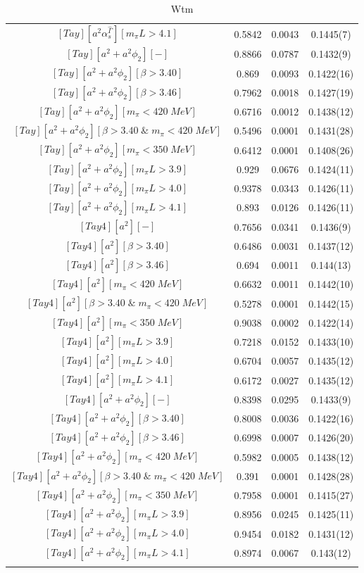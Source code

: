 \begin{longtable}{ c | c | c | c }
$[Tay][a^2\alpha_s^{\hat{\Gamma}}][m_{\pi}L>4.1]$ & 0.5842 & 0.0043 & 0.1445(7) \\
$[Tay][a^2+a^2\phi_2][-]$ & 0.8866 & 0.0787 & 0.1432(9) \\
$[Tay][a^2+a^2\phi_2][\beta>3.40]$ & 0.869 & 0.0093 & 0.1422(16) \\
$[Tay][a^2+a^2\phi_2][\beta>3.46]$ & 0.7962 & 0.0018 & 0.1427(19) \\
$[Tay][a^2+a^2\phi_2][m_{\pi}<420\;MeV]$ & 0.6716 & 0.0012 & 0.1438(12) \\
$[Tay][a^2+a^2\phi_2][\beta>3.40\;\&\;m_{\pi}<420\;MeV]$ & 0.5496 & 0.0001 & 0.1431(28) \\
$[Tay][a^2+a^2\phi_2][m_{\pi}<350\;MeV]$ & 0.6412 & 0.0001 & 0.1408(26) \\
$[Tay][a^2+a^2\phi_2][m_{\pi}L>3.9]$ & 0.929 & 0.0676 & 0.1424(11) \\
$[Tay][a^2+a^2\phi_2][m_{\pi}L>4.0]$ & 0.9378 & 0.0343 & 0.1426(11) \\
$[Tay][a^2+a^2\phi_2][m_{\pi}L>4.1]$ & 0.893 & 0.0126 & 0.1426(11) \\
$[Tay4][a^2][-]$ & 0.7656 & 0.0341 & 0.1436(9) \\
$[Tay4][a^2][\beta>3.40]$ & 0.6486 & 0.0031 & 0.1437(12) \\
$[Tay4][a^2][\beta>3.46]$ & 0.694 & 0.0011 & 0.144(13) \\
$[Tay4][a^2][m_{\pi}<420\;MeV]$ & 0.6632 & 0.0011 & 0.1442(10) \\
$[Tay4][a^2][\beta>3.40\;\&\;m_{\pi}<420\;MeV]$ & 0.5278 & 0.0001 & 0.1442(15) \\
$[Tay4][a^2][m_{\pi}<350\;MeV]$ & 0.9038 & 0.0002 & 0.1422(14) \\
$[Tay4][a^2][m_{\pi}L>3.9]$ & 0.7218 & 0.0152 & 0.1433(10) \\
$[Tay4][a^2][m_{\pi}L>4.0]$ & 0.6704 & 0.0057 & 0.1435(12) \\
$[Tay4][a^2][m_{\pi}L>4.1]$ & 0.6172 & 0.0027 & 0.1435(12) \\
$[Tay4][a^2+a^2\phi_2][-]$ & 0.8398 & 0.0295 & 0.1433(9) \\
$[Tay4][a^2+a^2\phi_2][\beta>3.40]$ & 0.8008 & 0.0036 & 0.1422(16) \\
$[Tay4][a^2+a^2\phi_2][\beta>3.46]$ & 0.6998 & 0.0007 & 0.1426(20) \\
$[Tay4][a^2+a^2\phi_2][m_{\pi}<420\;MeV]$ & 0.5982 & 0.0005 & 0.1438(12) \\
$[Tay4][a^2+a^2\phi_2][\beta>3.40\;\&\;m_{\pi}<420\;MeV]$ & 0.391 & 0.0001 & 0.1428(28) \\
$[Tay4][a^2+a^2\phi_2][m_{\pi}<350\;MeV]$ & 0.7958 & 0.0001 & 0.1415(27) \\
$[Tay4][a^2+a^2\phi_2][m_{\pi}L>3.9]$ & 0.8956 & 0.0245 & 0.1425(11) \\
$[Tay4][a^2+a^2\phi_2][m_{\pi}L>4.0]$ & 0.9454 & 0.0182 & 0.1431(12) \\
$[Tay4][a^2+a^2\phi_2][m_{\pi}L>4.1]$ & 0.8974 & 0.0067 & 0.143(12) \\
\bottomrule
\caption{Wtm}
\end{longtable}

